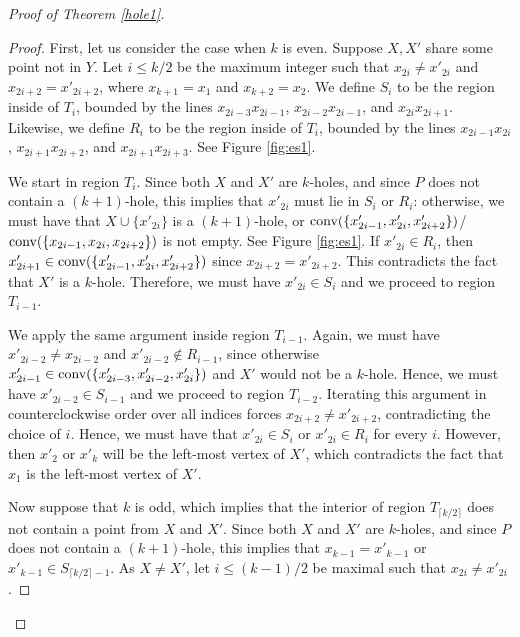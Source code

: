 \documentclass[10pt,a4paper]{amsart}
\def\conv{\mbox{\rm conv}}
\begin{document}
\begin{proof}[Proof of Theorem \ref{hole1}]
\begin{proof}
  First, let us consider the case when $k$ is even.  Suppose $X,X'$ share some point not in $Y$.  Let $i\leq k/2$ be the maximum integer such that $x_{2i} \neq x'_{2i}$ and $x_{2i + 2} = x'_{2i+2}$, where $x_{k + 1} = x_1$ and $x_{k + 2} = x_2$.  We define $S_i$ to be the region inside of $T_i$, bounded by the lines $x_{2i-3}x_{2i-1}$, $x_{2i-2}x_{2i-1}$, and $x_{2i}x_{2i+1}$.   Likewise, we define $R_i$ to be the region inside of $T_i$, bounded by the lines $x_{2i-1}x_{2i}$, $x_{2i+1}x_{2i+2}$, and $x_{2i + 1}x_{2i+3}$.  See Figure \ref{fig:es1}.    





We start in region $T_i$.  Since both $X$ and $X'$ are $k$-holes, and since $P$ does not contain a $(k + 1)$-hole, this implies that $x'_{2i}$ must lie in $S_i$ or $R_i$: otherwise, we must have that $X\cup \{x'_{2i}\}$ is a $(k+1)$-hole, or $\conv(\{x'_{2i - 1},x'_{2i},x'_{2i + 2}\})$/$\conv(\{x_{2i - 1},x_{2i},x_{2i + 2}\})$ is not empty.  See Figure \ref{fig:es1}.  If $x'_{2i} \in R_i$, then $x'_{2i + 1} \in \conv(\{x'_{2i - 1},x'_{2i},x'_{2i + 2}\})$ since $x_{2i + 2} = x'_{2i+2}$.  This contradicts the fact that $X'$ is a $k$-hole.  Therefore, we must have $x'_{2i} \in S_i$ and we proceed to region $T_{i-1}$.  

We apply the same argument inside region $T_{i-1}$.  Again, we must have $x'_{2i - 2} \neq x_{2i - 2}$ and $x'_{2i - 2}  \notin R_{i-1}$, since otherwise $x'_{2i - 1} \in \conv(\{x'_{2i - 3},x'_{2i-2},x'_{2i}\})$ and $X'$ would not be a $k$-hole.  Hence, we must have $x'_{2i-2} \in S_{i-1}$ and we proceed to region $T_{i-2}$.  Iterating this argument in counterclockwise order over all indices forces $x_{2i+2} \neq x'_{2i+2}$, contradicting the choice of $i$. Hence, we must have that $x'_{2i}\in S_i$ or $x'_{2i}\in R_i$ for every $i$. However, then $x'_2$ or $x'_{k}$ will be the left-most vertex of $X'$, which contradicts the fact that $x_1$ is the left-most vertex of $X'$. 

\medskip


Now suppose that $k$ is odd, which implies that the interior of region $T_{\lceil k/2\rceil}$ does not contain a point from $X$ and $X'$. Since both $X$ and $X'$ are $k$-holes, and since $P$ does not contain a $(k + 1)$-hole, this implies that $x_{k-1}=x'_{k-1}$ or $x'_{k-1} \in S_{\lceil k/2\rceil-1}$. As $X\neq X'$, let $i\leq (k-1)/2$ be maximal such that $x_{2i} \neq x'_{2i}$. 






\end{proof}
\end{proof}
\end{document}

